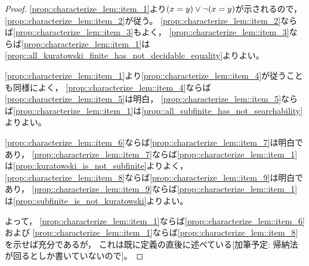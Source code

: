 \begin{proof}
    \cref{prop::characterize_lem::item_1}より\((x=y)\vee\neg(x=y)\)が示されるので，
    \cref{prop::characterize_lem::item_2}が従う。
    \cref{prop::characterize_lem::item_2}ならば\cref{prop::characterize_lem::item_3}もよく，
    \cref{prop::characterize_lem::item_3}ならば\cref{prop::characterize_lem::item_1}は\cref{prop::all_kuratowski_finite_has_not_decidable_equality}よりよい。

    \cref{prop::characterize_lem::item_1}より\cref{prop::characterize_lem::item_4}が従うことも同様によく，
    \cref{prop::characterize_lem::item_4}ならば\cref{prop::characterize_lem::item_5}は明白，
    \cref{prop::characterize_lem::item_5}ならば\cref{prop::characterize_lem::item_1}は\cref{prop::all_subfinite_has_not_searchability}よりよい。

    \cref{prop::characterize_lem::item_6}ならば\cref{prop::characterize_lem::item_7}は明白であり，
    \cref{prop::characterize_lem::item_7}ならば\cref{prop::characterize_lem::item_1}は\cref{prop::kuratowski_is_not_subfinite}よりよく，
    \cref{prop::characterize_lem::item_8}ならば\cref{prop::characterize_lem::item_9}は明白であり，
    \cref{prop::characterize_lem::item_9}ならば\cref{prop::characterize_lem::item_1}は\cref{prop::subfinite_is_not_kuratowski}よりよい。

    よって，
    \cref{prop::characterize_lem::item_1}ならば\cref{prop::characterize_lem::item_6}および
    \cref{prop::characterize_lem::item_1}ならば\cref{prop::characterize_lem::item_8}を示せば充分であるが，
    これは既に定義の直後に述べている{\color{red}[加筆予定: 帰納法が回るとしか書いていないので]}。
\end{proof}
